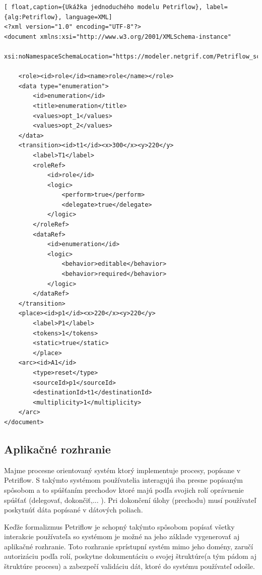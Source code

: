 \begin{lstlisting}[ float,caption={Ukážka jednoduchého modelu Petriflow}, label={alg:Petriflow}, language=XML]
<?xml version="1.0" encoding="UTF-8"?>
<document xmlns:xsi="http://www.w3.org/2001/XMLSchema-instance"
          xsi:noNamespaceSchemaLocation="https://modeler.netgrif.com/Petriflow_schema.xsd">
          
    <role><id>role</id><name>role</name></role>
    <data type="enumeration"> 
        <id>enumeration</id>
        <title>enumeration</title>
        <values>opt_1</values>
        <values>opt_2</values>
    </data>
    <transition><id>t1</id><x>300</x><y>220</y>
        <label>T1</label>
        <roleRef>
            <id>role</id>
            <logic>
                <perform>true</perform>
                <delegate>true</delegate>
            </logic>
        </roleRef>
        <dataRef> 
            <id>enumeration</id>
            <logic>
                <behavior>editable</behavior>
                <behavior>required</behavior>
            </logic>
        </dataRef>
    </transition>
    <place><id>p1</id><x>220</x><y>220</y>
        <label>P1</label>
        <tokens>1</tokens>
        <static>true</static>
        </place>
    <arc><id>A1</id>
        <type>reset</type>
        <sourceId>p1</sourceId>
        <destinationId>t1</destinationId>
        <multiplicity>1</multiplicity>
    </arc>
</document>
\end{lstlisting}






\subsection{Aplikačné rozhranie}

Majme procesne orientovaný systém ktorý implementuje procesy, popísane v Petriflow. S takýmto systémom používatelia interagujú iba presne popísaným spôsobom a to spúšťaním prechodov ktoré majú podľa svojich rolí oprávnenie spúšťať (delegovať, dokončiť,... ). Pri dokončení úlohy (prechodu) musí používateľ poskytnúť dáta popísané v dátových poliach.

Keďže formalizmus Petriflow je schopný takýmto spôsobom popísať všetky interakcie používateľa so systémom je možné na jeho základe vygenerovať aj aplikačné rozhranie. Toto rozhranie sprístupní systém mimo jeho domény, zaručí autorizáciu podľa rolí, poskytne dokumentáciu o svojej štruktúre(a tým pádom aj štruktúre procesu) a zabezpečí validáciu dát, ktoré do systému používateľ odošle.

